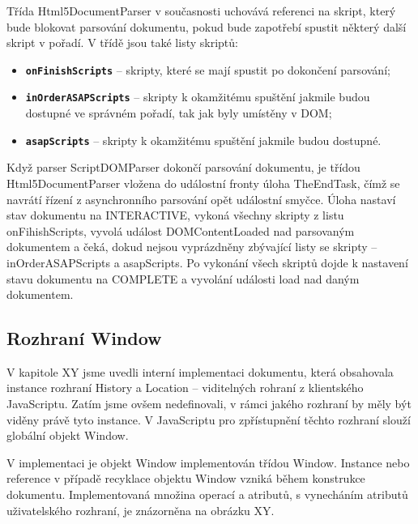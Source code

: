 Třída Html5DocumentParser v současnosti uchovává referenci na skript, který bude blokovat parsování dokumentu, pokud bude zapotřebí spustit některý další skript v pořadí. V třídě jsou také listy skriptů:

\begin{itemize}
  \item \textbf{\texttt{onFinishScripts}} -- skripty, které se mají spustit po dokončení parsování;
  \item \textbf{\texttt{inOrderASAPScripts}} -- skripty k okamžitému spuštění jakmile budou dostupné ve správném pořadí, tak jak byly umístěny v DOM;
  \item \textbf{\texttt{asapScripts}} -- skripty k okamžitému spuštění jakmile budou dostupné. 
\end{itemize}

Když parser ScriptDOMParser dokončí parsování dokumentu, je třídou Html5DocumentParser vložena do událostní fronty úloha TheEndTask, čímž se navrátí řízení z asynchronního parsování opět událostní smyčce. Úloha nastaví stav dokumentu na INTERACTIVE, vykoná všechny skripty z listu onFihishScripts, vyvolá událost DOMContentLoaded nad parsovaným dokumentem a čeká, dokud nejsou vyprázdněny zbývající listy se skripty -- inOrderASAPScripts a asapScripts. Po vykonání všech skriptů dojde k nastavení stavu dokumentu na COMPLETE a vyvolání události load nad daným dokumentem. 

\subsection{Rozhraní Window}
\label{Chapter.Implementation.WindowInterface}

V kapitole XY jsme uvedli interní implementaci dokumentu, která obsahovala instance rozhraní History a Location -- viditelných rohraní z klientského JavaScriptu. Zatím jsme ovšem nedefinovali, v rámci jakého rozhraní by měly být viděny právě tyto instance. V JavaScriptu pro zpřístupnění těchto rozhraní slouží globální objekt Window.

V implementaci je objekt Window implementován třídou Window. Instance nebo reference v případě recyklace objektu Window vzniká během konstrukce dokumentu. Implementovaná množina operací a atributů, s vynecháním atributů uživatelského rozhraní, je znázorněna na obrázku XY. 

